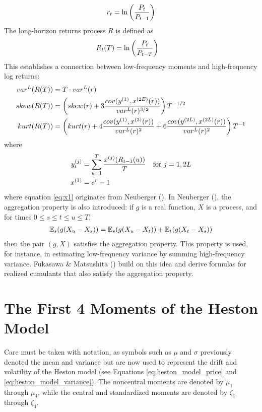 \begin{align}
    r_t = \ln\left(\frac{P_t}{P_{t-1}}\right) \notag
\end{align}
The long-horizon returns process $R$ is defined as
\begin{align}
    R_t(T) &= \ln\left(\frac{P_t}{P_{t-T}}\right) \notag
\end{align}
This establishes a connection between low-frequency moments and high-frequency log returns:
\begin{align}
    var^L(R(T)) &= T\cdot var^L(r) \notag \\
    skew(R(T)) &= \left(skew(r) + 3\frac{cov(y^{(1)}, x^{(2E)}(r))}{var^L(r)^{3/2}}\right)T^{-1/2} \notag \\
    kurt(R(T)) &= \left(kurt(r) + 4\frac{cov(y^{(1)}, x^{(3)}(r))}{var^L(r)^2} + 6\frac{cov(y^{(2L)}, x^{(2L)}(r))}{var^L(r)^2}\right)T^{-1} \notag
\end{align}
where
\begin{align}
    y_t^{(j)} &= \sum_{u=1}^T \frac{x^{(j)}(R_{t-1}(u))}{T} \quad\text{for } j = 1,2L\notag \\
    \label{eq:x1}
    x^{(1)} &= e^r-1
\end{align}
where equation \eqref{eq:x1} originates from Neuberger (\citeyear{neubergerRealizedSkewness2012}). In Neuberger (\citeyear{neubergerRealizedSkewness2012}), the aggregation property is also introduced: if $g$ is a real function, $X$ is a process, and for times $0\le s\le t\le u\le T$,
\begin{align}
    \mathbb{E}_s(g(X_u-X_s)) = \mathbb{E}_s(g(X_u-X_t)) + \mathbb{E}_t(g(X_t-X_s))\notag
\end{align}
then the pair $(g,X)$ satisfies the aggregation property. This property is used, for instance, in estimating low-frequency variance by summing high-frequency variance. Fukasawa \& Matsushita (\citeyear{fukasawaRealizedCumulantsMartingales2021}) build on this idea and derive formulas for realized cumulants that also satisfy the aggregation property.

\section{The First 4 Moments of the Heston Model}

Care must be taken with notation, as symbols such as $\mu$ and $\sigma$ previously denoted the mean and variance but are now used to represent the drift and volatility of the Heston model (see Equations \eqref{eq:heston_model_price} and \eqref{eq:heston_model_variance}). The noncentral moments are denoted by $\mu_1$ through $\mu_4$, while the central and standardized moments are denoted by $\zeta_1$ through $\zeta_4$.

